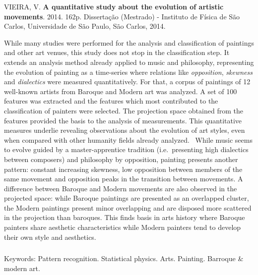 \afterpage{\blankpage}

\begin{abstract2}
\vspace{-10mm}
VIEIRA, V. \textbf{A quantitative study about the evolution of artistic movements}. 2014. 162p. Dissertação (Mestrado) - Instituto de Física de São Carlos, Universidade de São Paulo, São Carlos, 2014.
\vspace{15mm}

  While many studies were performed for the analysis and
  classification of paintings and other art venues, this study does
  not stop in the classification step. It extends an analysis method
  already applied to music and philosophy, representing the evolution
  of painting as a time-series where relations like
  \textit{opposition}, \textit{skewness} and \textit{dialectics} were
  measured quantitatively. For that, a corpus of paintings of 12
  well-known artists from Baroque and Modern art was analyzed. A set
  of 100 features was extracted and the features which most contributed
  to the classification of painters were selected. The projection
  space obtained from the features provided the basis to the analysis
  of measurements. This quantitative measures underlie revealing
  observations about the evolution of art styles, even when compared
  with other humanity fields already analyzed.~\cite{vieira} While
  music seems to evolve guided by a master-apprentice tradition
  (i.e.\ presenting high dialectics between composers) and philosophy
  by opposition, painting presents another pattern: constant
  increasing skewness, low opposition between members of the same
  movement and opposition peaks in the transition between movements. A
  difference between Baroque and Modern movements are also observed in
  the projected space: while Baroque paintings are presented as an
  overlapped cluster, the Modern paintings present minor overlapping
  and are disposed more scattered in the projection than
  baroques. This finds basis in arts history where Baroque painters
  share aesthetic characteristics while Modern painters tend to
  develop their own style and aesthetics.

$\phantom{linha em branco}$\\
Keywords: Pattern recognition. Statistical physics. Arts. Painting. Barroque \& modern art.

\end{abstract2}
